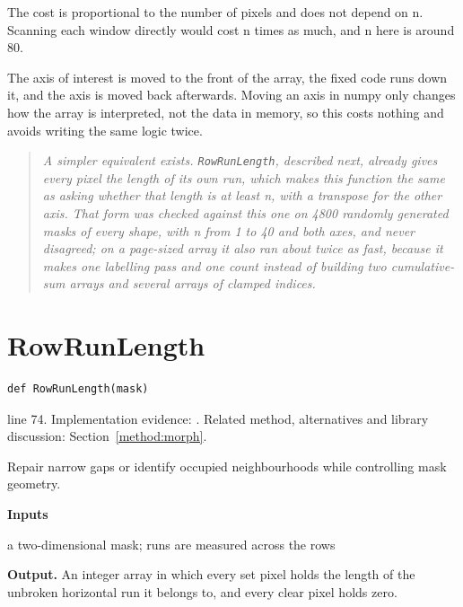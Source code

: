 The cost is proportional to the number of pixels and does not depend on n. Scanning each window directly would cost n times as much, and n here is around 80.


The axis of interest is moved to the front of the array, the fixed code runs down it, and the axis is moved back afterwards. Moving an axis in numpy only changes how the array is interpreted, not the data in memory, so this costs nothing and avoids writing the same logic twice.


\begin{quote}\small\itshape A simpler equivalent exists. \texttt{RowRunLength}, described next, already gives every pixel the length of its own run, which makes this function the same as asking whether that length is at least n, with a transpose for the other axis. That form was checked against this one on 4800 randomly generated masks of every shape, with n from 1 to 40 and both axes, and never disagreed; on a page-sized array it also ran about twice as fast, because it makes one labelling pass and one count instead of building two cumulative-sum arrays and several arrays of clamped indices.\end{quote}


\section{RowRunLength}\label{fn:segment:RowRunLength}
\begin{lstlisting}[style=sig]
def RowRunLength(mask)
\end{lstlisting}
 line 74. Implementation evidence: \cite{code2026}. Related method, alternatives and library discussion: Section~\ref{method:morph}.


Repair narrow gaps or identify occupied neighbourhoods while controlling mask geometry.




\noindent\textbf{Inputs}
\begin{description}[leftmargin=2.2em,style=nextline,font=\normalfont\ttfamily]\setlength\itemsep{1pt}
  \item[{mask}] \normalfont a two-dimensional mask; runs are measured across the rows
\end{description}

\noindent\textbf{Output.} An integer array in which every set pixel holds the length of the unbroken horizontal run it belongs to, and every clear pixel holds zero.


